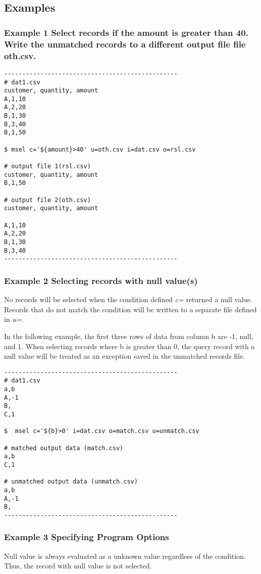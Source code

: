 \documentclass[a4paper]{jarticle}
\begin{document}
\subsection*{Examples}
\subsubsection*{Example 1 Select records if the amount is greater than 40. Write the unmatched records to a different output file file oth.csv. }

\begin{verbatim}
------------------------------------------------
# dat1.csv
customer, quantity, amount 
A,1,10
A,2,20
B,1,30
B,3,40
B,1,50

$ msel c='${amount}>40' u=oth.csv i=dat.csv o=rsl.csv

# output file 1(rsl.csv)
customer, quantity, amount 
B,1,50

# output file 2(oth.csv)
customer, quantity, amount 

A,1,10
A,2,20
B,1,30
B,3,40
------------------------------------------------
\end{verbatim}

\subsubsection*{Example 2 Selecting records with null value(s)}
No records will be selected when the condition defined \emph{c=} returned a null value. Records that do not match the condition will be written to a separate file defined in \emph{u=}. 
 
In the following example, the first three rows of data from column b are -1, null, and 1. When selecting records where b is greater than 0, the query record with a null value will be treated as an exception saved in the unmatched records file. 


\begin{verbatim}
------------------------------------------------
# dat1.csv
a,b
A,-1
B,
C,1

$  msel c='${b}>0' i=dat.csv o=match.csv u=unmatch.csv

# matched output data (match.csv)
a,b
C,1

# unmatched output data (unmatch.csv)
a,b
A,-1
B,
------------------------------------------------
\end{verbatim}

\subsubsection*{Example 3 Specifying Program Options}
Null value is always evaluated as a unknown value regardless of the condition. Thus, the record with null value is not selected. 
 
\end{document}
